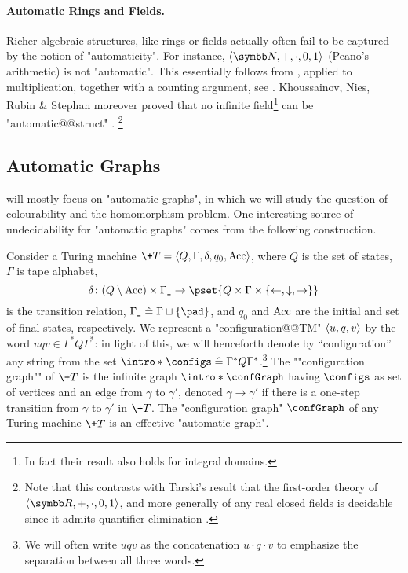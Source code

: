 \paragraph*{Automatic Rings and Fields.}
Richer algebraic structures, like rings or fields actually often fail to be captured by
the notion of "automaticity". For instance, $\tup{\N,{+},{\cdot},0,1}$ (Peano's arithmetic)
is not "automatic".
This essentially follows from , applied to multiplication,
together with a counting argument, see \cite[Corollary~XII.8.11]{Blumensath2024MSOModelTheory}.
Khoussainov, Nies, Rubin \& Stephan moreover proved that no infinite field\footnote{In fact their result also holds for integral domains.} can be "automatic@@struct"
\cite[Theorem~3.10 \& Corollary~3.11]{JainKhoussainovSchlichtStephan2019IsomorphismTreeAutomaticOrdinals}.%
\footnote{Note that this contrasts with Tarski's result that the first-order theory
of $\tup{\R,+,\cdot,0,1}$, and more generally of any real closed fields is 
decidable since it admits quantifier elimination \cite[Theorem~8.4.4]{Hodges1993ModelTheory}.}


\subsection{Automatic Graphs}
 will mostly focus on "automatic graphs", in which we will study
the question of colourability and the homomorphism problem.
One interesting source of undecidability for "automatic graphs" comes from the following construction.

\begin{example}
	Consider a Turing machine $\+T = \tup{Q,\Gamma,\delta,q_0,\Acc}$, where $Q$ is the set of states, $\Gamma$ is tape alphabet,
	\[
		\delta\colon (Q \setminus \Acc) \times \Gamma_{\smallpad} \to \pset{Q \times \Gamma \times \set{\leftarrow, \downarrow, \rightarrow}}
	\]
	is the transition relation, $\Gamma_{\smallpad} \defeq \Gamma \dcup \set{\pad}$, and $q_0$ and $\textrm{Acc}$ are the initial and set of final states, respectively.
	We represent a "configuration@@TM" $\langle u, q, v\rangle$ by the word $uqv \in \Gamma^* Q \Gamma^*$:
	in light of this, we will henceforth denote by ``configuration'' any string from the set  \AP$\intro*\configs \defeq  \Gamma^* Q \Gamma^*$.\footnote{We will often write
	$uqv$ as the concatenation $u\cdot q \cdot v$ to emphasize
	the separation between all three words.}
	The \AP""configuration graph"" of $\+T$ is the infinite graph $\intro*\confGraph$ having $\configs$ as set of vertices and an edge from $\gamma$ to $\gamma'$, denoted $\gamma \rightarrow \gamma'$ if there is a one-step transition from $\gamma$ to $\gamma'$ in $\+T$. The "configuration graph" $\confGraph$ of any Turing machine $\+T$ is an effective "automatic graph".
\end{example}

